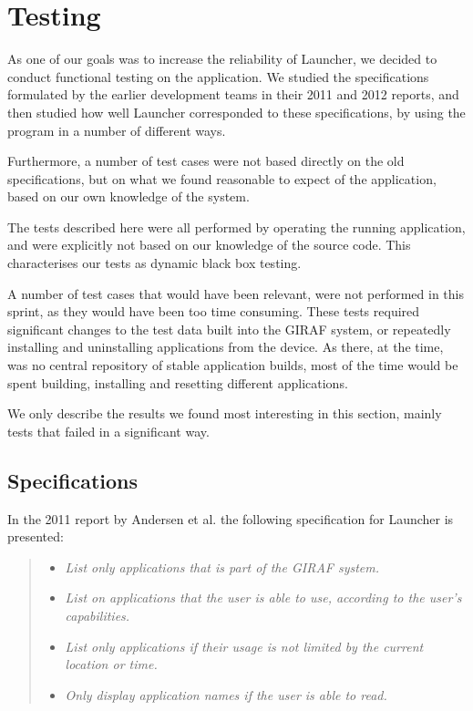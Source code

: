 \section{Testing}\label{sec:testing_sprint1}

As one of our goals was to increase the reliability of Launcher, we decided to conduct functional testing on the application.
We studied the specifications formulated by the earlier development teams in their 2011 \cite{launcher2011} and 2012 \cite{launcher2012} reports, and then studied how well Launcher corresponded to these specifications, by using the program in a number of different ways. 

Furthermore, a number of test cases were not based directly on the old specifications, but on what we found reasonable to expect of the application, based on our own knowledge of the system.

The tests described here were all performed by operating the running application, and were explicitly not based on our knowledge of the source code. 
This characterises our tests as dynamic black box testing. 

A number of test cases that would have been relevant, were not performed in this sprint, as they would have been too time consuming. 
These tests required significant changes to the test data built into the GIRAF system, or repeatedly installing and uninstalling applications from the device.
As there, at the time, was no central repository of stable application builds, most of the time would be spent building, installing and resetting different applications.

We only describe the results we found most interesting in this section, mainly tests that failed in a significant way. 

\subsection{Specifications}
In the 2011 report by Andersen et al. \cite{launcher2011} the following specification for Launcher is presented:
\begin{quote}
\begin{itemize}
	\item \textit{List only applications that is part of the GIRAF system.}
	\item \textit{List on applications that the user is able to use, according to the user's capabilities.}
	\item \textit{List only applications if their usage is not limited by the current location or time.}
	\item \textit{Only display application names if the user is able to read.}
\end{itemize}
\end{quote}

